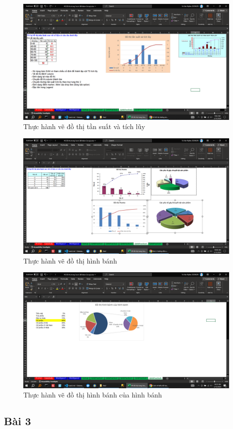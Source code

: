 \documentclass{article}
\begin{document}
\begin{figure}[H]
    \centering
    \includegraphics[scale = 0.15]{Bai2/ThucHanh/1.png}
    \caption{Thực hành vẽ đồ thị tần suất và tích lũy}
\end{figure}




\begin{figure}[H]
    \centering
    \includegraphics[scale = 0.15]{Bai2/ThucHanh/2.png}
    \caption{Thực hành vẽ đồ thị hình bánh}
\end{figure}




\begin{figure}[H]
    \centering
    \includegraphics[scale = 0.15]{Bai2/ThucHanh/3.png}
    \caption{Thực hành vẽ đồ thị hình bánh của hình bánh}
\end{figure}








\subsection{Bài 3}

\end{document}
